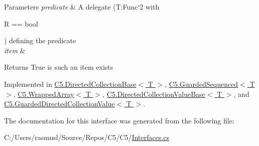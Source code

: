 \begin{DoxyParams}{Parameters}
{\em predicate} & A delegate (T\+:\+Func`2 with 
\begin{DoxyCode}
R == \textcolor{keywordtype}{bool}
\end{DoxyCode}
) defining the predicate\\
\hline
{\em item} & \\
\hline
\end{DoxyParams}
\begin{DoxyReturn}{Returns}
True is such an item exists
\end{DoxyReturn}


Implemented in \hyperlink{class_c5_1_1_directed_collection_base_a5dd3482ac69a6ef10092748c9953785b}{C5.\+Directed\+Collection\+Base$<$ T $>$}, \hyperlink{class_c5_1_1_guarded_sequenced_a4741f8cd5c5fa8fb3d6b7a71268cdefb}{C5.\+Guarded\+Sequenced$<$ T $>$}, \hyperlink{class_c5_1_1_wrapped_array_a4917a0c9bba4103b8e63df21b3f9804d}{C5.\+Wrapped\+Array$<$ T $>$}, \hyperlink{class_c5_1_1_directed_collection_value_base_af3d97f14823310f6afd1980d181a4f82}{C5.\+Directed\+Collection\+Value\+Base$<$ T $>$}, and \hyperlink{class_c5_1_1_guarded_directed_collection_value_a755cdf8f197ed79d7616a2b2527d718d}{C5.\+Guarded\+Directed\+Collection\+Value$<$ T $>$}.



The documentation for this interface was generated from the following file\+:\begin{DoxyCompactItemize}
\item 
C\+:/\+Users/rasmusl/\+Source/\+Repos/\+C5/\+C5/\hyperlink{_interfaces_8cs}{Interfaces.\+cs}\end{DoxyCompactItemize}
